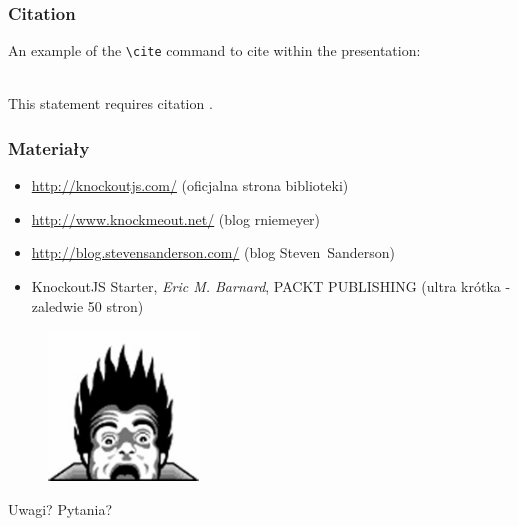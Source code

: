 \documentclass{beamer}
\begin{document}
\begin{frame}[fragile] %
\frametitle{Citation}
An example of the \verb|\cite| command to cite within the presentation:\\~

This statement requires citation \cite{p1}.
\end{frame}


\begin{frame}
	\frametitle{Materiały}
	\begin{itemize}
		\item
			\url{http://knockoutjs.com/} (oficjalna strona biblioteki)
		\item
			\url{http://www.knockmeout.net/} (blog rniemeyer)
		\item
			\url{http://blog.stevensanderson.com/} (blog Steven~Sanderson)
		\item
			KnockoutJS Starter, \textit{Eric M. Barnard}, PACKT PUBLISHING 
			(ultra krótka - zaledwie 50 stron)
	\end{itemize}
\end{frame}


\begin{frame}
	\begin{figure}
		\centering
		\includegraphics[width=4cm]{img/coding_horror}
	\end{figure}
	\Huge{\centerline{Uwagi? Pytania?}}
\end{frame}

\end{document}
